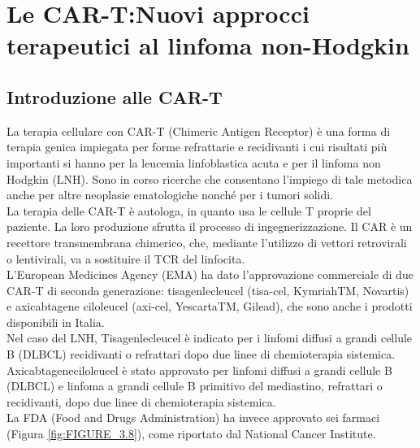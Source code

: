 \chapter{Le CAR-T:Nuovi approcci terapeutici al linfoma non-Hodgkin}

\section{Introduzione alle CAR-T}

La terapia cellulare con CAR-T (Chimeric Antigen Receptor) è una forma di terapia genica impiegata per forme 
refrattarie e recidivanti  i cui risultati più importanti si hanno per la leucemia linfoblastica acuta e per il 
linfoma non Hodgkin (LNH). Sono in corso ricerche che consentano l’impiego di tale metodica anche per altre neoplasie 
ematologiche nonché per i tumori solidi.\\
La terapia delle CAR-T è autologa, in quanto usa le cellule T proprie del paziente. La loro produzione sfrutta 
il processo di ingegnerizzazione. Il CAR è un recettore transmembrana chimerico, che, mediante l’utilizzo di 
vettori retrovirali o lentivirali, va a sostituire il TCR del linfocita.\\
L’European Medicines Agency (EMA) ha dato l’approvazione commerciale di due CAR-T di seconda generazione: 
tisagenlecleucel (tisa-cel, KymriahTM, Novartis) e axicabtagene ciloleucel (axi-cel, YescartaTM, Gilead), 
che sono anche i prodotti disponibili in Italia\cite{reteveneta}.\\
Nel caso del LNH, Tisagenlecleucel è indicato per i linfomi diffusi a grandi cellule B (DLBCL) recidivanti o 
refrattari dopo due linee di chemioterapia sistemica.\\ Axicabtageneciloleucel è stato approvato per linfomi 
diffusi a grandi cellule B (DLBCL) e linfoma a grandi cellule B primitivo del mediastino, 
refrattari o recidivanti, dopo due linee di chemioterapia sistemica\cite{EMATOCART}.\\
La FDA (Food and Drugs Administration) ha invece approvato sei farmaci (Figura \ref{fig:FIGURE_3.8}), come 
riportato dal National Cancer Institute\cite{NIHCART}.\\

